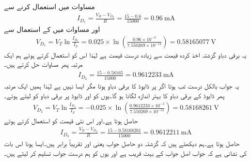 مساوات   میں  استعمال کرنے سے
\begin{align*}
I_{D_1}=\frac{V_B-V_{D_0}}{R}=\frac{15-0.6}{15000}=\SI{0.96}{\milli \ampere}
\end{align*}
اور مساوات   میں  کے استعمال سے
\begin{align*}
V_{D_1}=V_T \ln \frac{I_{D_1}}{I_S}=0.025 \times \ln \left (\frac{0.96 \times 10^{-3}}{7.550269 \times 10^{-14}} \right )=\SI{0.58165077}{\volt}
\end{align*}
یہ برقی دباو گزشتہ اخذ کردہ قیمت سے زیادہ درست قیمت ہے لہٰذا اس کو استعمال کرتے ہوئے ہم ایک مرتبہ پھر مساوات  حل کرتے ہیں۔
\begin{align*}
I_{D_2}=\frac{15-0.58165}{15000}=\SI{0.9612233}{\milli \ampere}
\end{align*}
یہ جواب بالکل درست تب ہوتا اگر  پر ڈایوڈ کا برقی دباو  ہوتا مگر ایسا نہیں ہے لہٰذا ہمیں ایک مرتبہ پھر ڈایوڈ کے برقی دباو کا بہتر اندازہ لگانا ہو گا۔یوں  کو  اور  ڈایوڈ پر برقی دباو کو  لیتے ہوئے۔
\begin{align*}
V_{D_2}=V_T \ln \frac{I_{D_2}}{I_S}=-0.025 \times \ln \left ( \frac{0.9612233 \times 10^{-3}}{7.550269 \times 10^{-14}} \right )=\SI{0.58168261}{\volt}
\end{align*}
حاصل ہوتا ہے۔اور اس نئی قیمت کو استعمال کرتے ہوئے
\begin{align*}
I_{D_3}=\frac{V_B-V_{D_2}}{R}=\frac{15-0.58168261}{15000}=\SI{0.9612211}{\milli \ampere}
\end{align*}
حاصل ہوتا ہے۔ہم دیکھتے ہیں کہ گزشتہ دو حاصل جواب یعنی  اور  تقریباً برابر ہیں۔ایسا ہونا اس بات کی نشانی ہے کہ جواب اصل جواب کے بہت قریب ہے اور یوں  کو ہم درست جواب تسلیم کر لیتے ہیں۔


